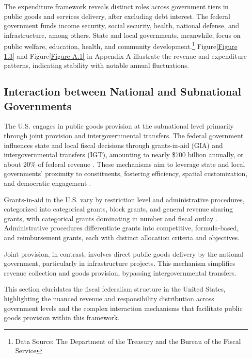 The expenditure framework reveals distinct roles across government tiers in public goods and services delivery, after excluding debt interest. The federal government funds income security, social security, health, national defense, and infrastructure, among others. State and local governments, meanwhile, focus on public welfare, education, health, and community development.\footnote[2]{Data Source: The Department of the Treasury and the Bureau of the Fiscal Service} Figure\ref*{Figure 1.3} and Figure\ref*{Figure A.1} in Appendix A illustrate the revenue and expenditure patterns, indicating stability with notable annual fluctuations.

\subsection{Interaction between National and Subnational Governments}

The U.S. engages in public goods provision at the subnational level primarily through joint provision and intergovernmental transfers. The federal government influences state and local fiscal decisions through grants-in-aid (GIA) and intergovernmental transfers (IGT), amounting to nearly \$700 billion annually, or about 20\% of federal revenue \parencite{dilger2015federal}. These mechanisms aim to leverage state and local governments' proximity to constituents, fostering efficiency, spatial customization, and democratic engagement \parencite{musgrave1997devolution}.

Grants-in-aid in the U.S. vary by restriction level and administrative procedures, categorized into categorical grants, block grants, and general revenue sharing grants, with categorical grants dominating in number and fiscal outlay \parencite{dilger2015federal}. Administrative procedures differentiate grants into competitive, formula-based, and reimbursement grants, each with distinct allocation criteria and objectives.

Joint provision, in contrast, involves direct public goods delivery by the national government, particularly in infrastructure projects. This mechanism simplifies revenue collection and goods provision, bypassing intergovernmental transfers.

This section elucidates the fiscal federalism structure in the United States, highlighting the nuanced revenue and responsibility distribution across government levels and the complex interaction mechanisms that facilitate public goods provision within this framework.

